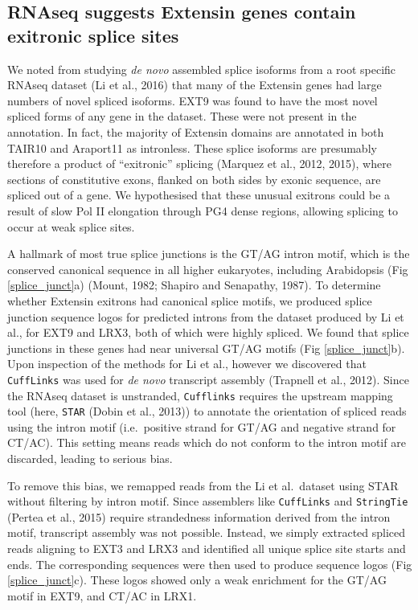 \documentclass[12pt,a4paper,]{report}
\begin{document}
\newpage

\hypertarget{rnaseq-suggests-extensin-genes-contain-exitronic-splice-sites}{%
\subsection{RNAseq suggests Extensin genes contain exitronic splice
sites}\label{rnaseq-suggests-extensin-genes-contain-exitronic-splice-sites}}

\label{ssec:extensin_splice_sites}

We noted from studying \emph{de novo} assembled splice isoforms from a
root specific RNAseq dataset (Li et al., 2016) that many of the Extensin
genes had large numbers of novel spliced isoforms. EXT9 was found to
have the most novel spliced forms of any gene in the dataset. These were
not present in the annotation. In fact, the majority of Extensin domains
are annotated in both TAIR10 and Araport11 as intronless. These splice
isoforms are presumably therefore a product of ``exitronic'' splicing
(Marquez et al., 2012, 2015), where sections of constitutive exons,
flanked on both sides by exonic sequence, are spliced out of a gene. We
hypothesised that these unusual exitrons could be a result of slow Pol
II elongation through PG4 dense regions, allowing splicing to occur at
weak splice sites.

A hallmark of most true splice junctions is the GT/AG intron motif,
which is the conserved canonical sequence in all higher eukaryotes,
including Arabidopsis (Fig \ref{splice_junct}a) (Mount, 1982; Shapiro
and Senapathy, 1987). To determine whether Extensin exitrons had
canonical splice motifs, we produced splice junction sequence logos for
predicted introns from the dataset produced by Li et al., for EXT9 and
LRX3, both of which were highly spliced. We found that splice junctions
in these genes had near universal GT/AG motifs (Fig
\ref{splice_junct}b). Upon inspection of the methods for Li et al.,
however we discovered that \texttt{CuffLinks} was used for \emph{de
novo} transcript assembly (Trapnell et al., 2012). Since the RNAseq
dataset is unstranded, \texttt{Cufflinks} requires the upstream mapping
tool (here, \texttt{STAR} (Dobin et al., 2013)) to annotate the
orientation of spliced reads using the intron motif (i.e.~positive
strand for GT/AG and negative strand for CT/AC). This setting means
reads which do not conform to the intron motif are discarded, leading to
serious bias.

To remove this bias, we remapped reads from the Li et al.~dataset using
STAR without filtering by intron motif. Since assemblers like
\texttt{CuffLinks} and \texttt{StringTie} (Pertea et al., 2015) require
strandedness information derived from the intron motif, transcript
assembly was not possible. Instead, we simply extracted spliced reads
aligning to EXT3 and LRX3 and identified all unique splice site starts
and ends. The corresponding sequences were then used to produce sequence
logos (Fig \ref{splice_junct}c). These logos showed only a weak
enrichment for the GT/AG motif in EXT9, and CT/AC in LRX1.
\end{document}
